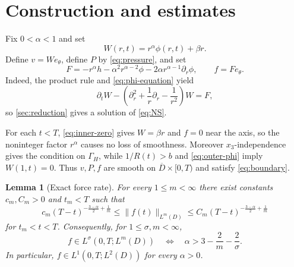 \documentclass[10pt]{amsart}
\newtheorem{lemma}[theorem]{Lemma}
\theoremstyle{definition}
\newcommand{\Gh}{\Gamma_{\!H}}
\begin{document}
\section{Construction and estimates}
\label{sec:construction}

Fix $0<\alpha<1$ and set
\begin{equation}
\label{eq:W-def}
    W(r,t)=r^\alpha\phi(r,t)+\beta r.
\end{equation}
Define $v=We_\theta$, define $P$ by \eqref{eq:pressure}, and set
\begin{equation}
\label{eq:F-def}
    F=-r^\alpha h
      -\alpha^2r^{\alpha-2}\phi
      -2\alpha r^{\alpha-1}\partial_r\phi,
    \qquad
    f=Fe_\theta.
\end{equation}
Indeed, the product rule and \eqref{eq:phi-equation} yield
\[
    \partial_tW-
    \left(\partial_r^2+\frac1r\partial_r-\frac1{r^2}\right)W=F,
\]
so \cref{sec:reduction} gives a solution of \eqref{eq:NS}.

For each $t<T$, \eqref{eq:inner-zero} gives $W=\beta r$ and $f=0$ near the
axis, so the noninteger factor $r^\alpha$ causes no loss of smoothness.
Moreover $x_3$-independence gives the condition on $\Gh$, while
$1/R(t)>b$ and \eqref{eq:outer-phi} imply $W(1,t)=0$.  Thus $v,P,f$ are smooth
on $\overline D\times[0,T)$ and satisfy \eqref{eq:boundary}.

\begin{lemma}[Exact force rate]
\label{lem:force-rate}
For every $1\leq m<\infty$ there exist constants $c_m,C_m>0$ and
$t_m<T$ such that
\begin{equation}
\label{eq:force-rate-m}
    c_m(T-t)^{-\frac{3-\alpha}{2}+\frac1m}
    \leq \|f(t)\|_{L^m(D)}
    \leq C_m(T-t)^{-\frac{3-\alpha}{2}+\frac1m}
\end{equation}
for $t_m<t<T$.  Consequently, for $1\leq \sigma,m<\infty$,
\begin{equation}
\label{eq:force-iff}
    f\in L^\sigma(0,T;L^m(D))
    \quad\Longleftrightarrow\quad
    \alpha>3-\frac2m-\frac2\sigma.
\end{equation}
In particular, $f\in L^1(0,T;L^2(D))$ for every $\alpha>0$.
\end{lemma}
\end{document}
